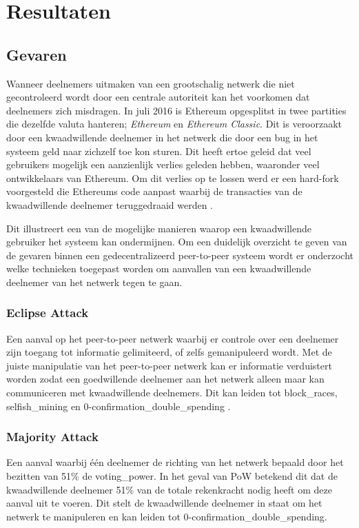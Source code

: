 \newpage
\chapter{Resultaten}



\newpage
\section{Gevaren}

Wanneer deelnemers uitmaken van een grootschalig netwerk die niet gecontroleerd wordt door een centrale autoriteit kan het voorkomen dat deelnemers zich misdragen. In juli 2016 is Ethereum opgesplitst in twee partities die dezelfde valuta hanteren; \textit{Ethereum} en \textit{Ethereum Classic}. Dit is veroorzaakt door een kwaadwillende deelnemer in het netwerk die door een bug in het systeem geld naar zichzelf toe kon sturen. Dit heeft ertoe geleid dat veel gebruikers mogelijk een aanzienlijk verlies geleden hebben, waaronder veel ontwikkelaars van Ethereum. Om dit verlies op te lossen werd er een hard-fork voorgesteld die Ethereums code aanpast waarbij de transacties van de kwaadwillende deelnemer teruggedraaid werden \citep{kiffer2017stick}. 

Dit illustreert een van de mogelijke manieren waarop een kwaadwillende gebruiker het systeem kan ondermijnen. Om een duidelijk overzicht te geven van de gevaren binnen een gedecentralizeerd peer-to-peer systeem wordt er onderzocht welke technieken toegepast worden om aanvallen van een kwaadwillende deelnemer van het netwerk tegen te gaan.

\subsection{Eclipse Attack}
Een aanval op het peer-to-peer netwerk waarbij er controle over een deelnemer zijn toegang tot informatie gelimiteerd, of zelfs gemanipuleerd wordt. Met de juiste manipulatie van het peer-to-peer netwerk kan er informatie verduistert worden zodat een goedwillende deelnemer aan het netwerk alleen maar kan communiceren met kwaadwillende deelnemers. Dit kan leiden tot \gls{block_races}, \gls{selfish_mining} en \gls{0-confirmation_double_spending} \citep{heilman2015eclipse}.

\subsection{Majority Attack}
Een aanval waarbij één deelnemer de richting van het netwerk bepaald door het bezitten van 51\% de \gls{voting_power}. In het geval van \acrlong{PoW} betekend dit dat de kwaadwillende deelnemer 51\% van de totale rekenkracht nodig heeft om deze aanval uit te voeren. Dit stelt de kwaadwillende deelnemer in staat om het netwerk te manipuleren en kan leiden tot \gls{0-confirmation_double_spending}.

